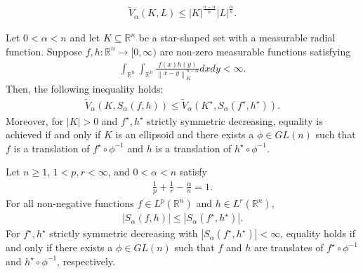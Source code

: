 \documentclass[10pt,a4paper]{amsart}
\begin{document}
\begin{eqnarray}\label{2a}
	\widetilde{V}_{\alpha} (K,L)\leq |K|^{\frac{n-\alpha}{n}}|L|^{\frac{\alpha}{n}}.
\end{eqnarray}

\begin{lem}\label{4.2}  Let $0 < \alpha < n$ and let $K \subseteq \mathbb{R}^n$ be a star-shaped set with a measurable radial function. Suppose $f, h: \mathbb{R}^n \to [0, \infty)$ are non-zero measurable functions satisfying
	\begin{eqnarray*}
		\int_{\mathbb{R}^n }\int_{\mathbb{R}^n} \frac{f(x)h(y)}{{\left \| x-y \right \|}_{K}^{n-\alpha}} dxdy < \infty.
		\end{eqnarray*}
		Then, the following inequality holds:
		\begin{eqnarray*}
			\widetilde{V}_{\alpha} (K, {S}_{\alpha}(f, h)) \leq \widetilde{V}_{\alpha} (K^{\star}, {S}_{\alpha}(f^{\star}, h^{\star})).
		\end{eqnarray*}
		Moreover, for $|K| > 0$ and $f^{\star },h^{\star }$ strictly symmetric decreasing, equality is achieved if and only if $K$ is an ellipsoid and there exists a $\phi\in GL(n)$ such that $f$ is a translation of $f^{\star} \circ \phi^{-1}$ and $h$ is a translation of $h^{\star} \circ \phi^{-1}$. 
\end{lem}

\begin{lem}\label{l4.3} Let $n\ge 1$, $1<p,r<\infty $, and $0<\alpha <n$ satisfy
	\begin{eqnarray}
		\frac{1}{p}+\frac{1}{r}-\frac{\alpha }{n}=1.\nonumber   
	\end{eqnarray}
	For all non-negative functions $f\in L^{p}\left ( \mathbb{R}^n  \right ) $ and $h\in L^{r}\left ( \mathbb{R}^n  \right ) $,
	\begin{eqnarray*}
		\left | S_{\alpha }\left ( f,h \right )   \right |\le  \left | S_{\alpha }\left ( f^{\star } ,h^{\star }  \right )   \right |.
	\end{eqnarray*}
	For $f^{\star },h^{\star }$ strictly symmetric decreasing with $| {S}_{\alpha }(f^{\star },h^{\star })| < \infty $, equality holds if and only if there exists a $\phi\in GL(n)$ such that $f$ and $h$ are translates  of $f^{\star }\circ \phi ^{-1}$ and $h^{\star }\circ \phi ^{-1}$, respectively.
\end{lem}
\end{document}
